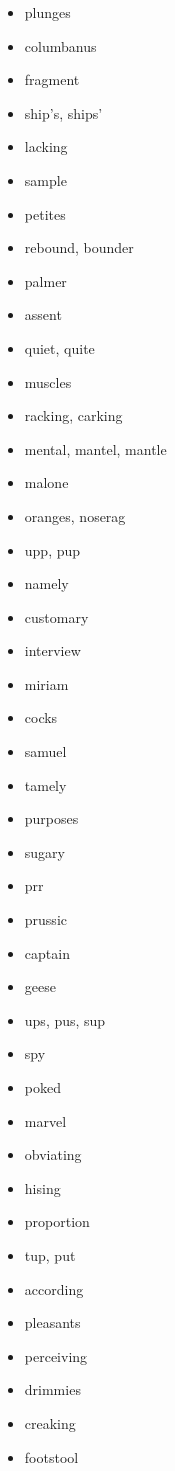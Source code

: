 \documentclass{article}
\begin{document}
\begin{itemize}
    \item plunges
    \item columbanus
    \item fragment
    \item ship's, ships'
    \item lacking
    \item sample
    \item petites
    \item rebound, bounder
    \item palmer
    \item assent
    \item quiet, quite
    \item muscles
    \item racking, carking
    \item mental, mantel, mantle
    \item malone
    \item oranges, noserag
    \item upp, pup
    \item namely
    \item customary
    \item interview
    \item miriam
    \item cocks
    \item samuel
    \item tamely
    \item purposes
    \item sugary
    \item prr
    \item prussic
    \item captain
    \item geese
    \item ups, pus, sup
    \item spy
    \item poked
    \item marvel
    \item obviating
    \item hising
    \item proportion
    \item tup, put
    \item according
    \item pleasants
    \item perceiving
    \item drimmies
    \item creaking
    \item footstool

\end{itemize}
\end{document}
